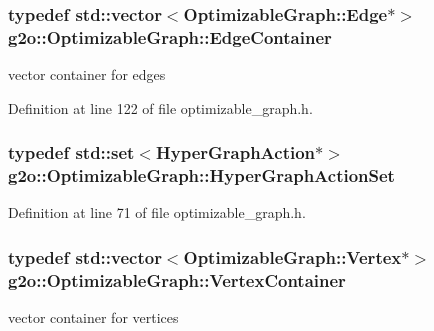 \subsubsection[{\texorpdfstring{Edge\+Container}{EdgeContainer}}]{\setlength{\rightskip}{0pt plus 5cm}typedef std\+::vector$<${\bf Optimizable\+Graph\+::\+Edge}$\ast$$>$ {\bf g2o\+::\+Optimizable\+Graph\+::\+Edge\+Container}}\hypertarget{structg2o_1_1OptimizableGraph_a2b43e807ae6d61ef8749ca1ef7c25f62}{}\label{structg2o_1_1OptimizableGraph_a2b43e807ae6d61ef8749ca1ef7c25f62}


vector container for edges 



Definition at line 122 of file optimizable\+\_\+graph.\+h.

\subsubsection[{\texorpdfstring{Hyper\+Graph\+Action\+Set}{HyperGraphActionSet}}]{\setlength{\rightskip}{0pt plus 5cm}typedef std\+::set$<${\bf Hyper\+Graph\+Action}$\ast$$>$ {\bf g2o\+::\+Optimizable\+Graph\+::\+Hyper\+Graph\+Action\+Set}}\hypertarget{structg2o_1_1OptimizableGraph_aa3562ad6794c36ea832095131cfffaac}{}\label{structg2o_1_1OptimizableGraph_aa3562ad6794c36ea832095131cfffaac}


Definition at line 71 of file optimizable\+\_\+graph.\+h.

\subsubsection[{\texorpdfstring{Vertex\+Container}{VertexContainer}}]{\setlength{\rightskip}{0pt plus 5cm}typedef std\+::vector$<${\bf Optimizable\+Graph\+::\+Vertex}$\ast$$>$ {\bf g2o\+::\+Optimizable\+Graph\+::\+Vertex\+Container}}\hypertarget{structg2o_1_1OptimizableGraph_a54f01b9b6071e65e6abeebe4afb29dec}{}\label{structg2o_1_1OptimizableGraph_a54f01b9b6071e65e6abeebe4afb29dec}


vector container for vertices 



